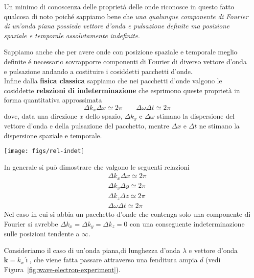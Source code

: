 Un minimo di conoscenza delle proprietà delle onde riconosce in questo
fatto qualcosa di noto poiché sappiamo bene che \emph{una qualunque
componente di Fourier di un'onda piana possiede vettore d'onda e
pulsazione definite ma posizione spaziale e temporale assolutamente
indefinite}.

Sappiamo anche che per avere onde con posizione spaziale e temporale
meglio definite é necessario sovrapporre componenti di Fourier di
diverso vettore d'onda e pulsazione andando a costituire i cosiddetti
pacchetti d'onde.\\
Infine dalla \textbf{fisica classica} sappiamo che nei pacchetti d'onde valgono
le cosiddette \textbf{relazioni di indeterminazione} che esprimono
queste proprietà in forma quantitativa approssimata
\[
    \Delta k_{x} \Delta x \simeq2 \pi \qquad \Delta \omega \Delta t \simeq2 \pi
\] dove, data una direzione $x$ dello spazio, \(\Delta k_{x}\) e
\(\Delta \omega\) stimano la dispersione del vettore d'onda e della
pulsazione del pacchetto, mentre \(\Delta x\) e \(\Delta t\) ne stimano
la dispersione spaziale e temporale.
\begin{marginfigure}
    \texttt{[image: figs/rel-indet]}
    \label{fig:rel-indet}
\end{marginfigure}

In generale si può dimostrare che valgono le seguenti relazioni
\begin{gather*}
    \Delta k_{x} \Delta x \simeq2 \pi\\
    \Delta k_{y} \Delta y \simeq2 \pi\\
    \Delta k_{z} \Delta z \simeq2 \pi\\
    \Delta \omega \Delta t \simeq2 \pi
\end{gather*} Nel caso in cui si abbia un pacchetto d'onde che contenga solo una
componente di Fourier si avrebbe
\(\Delta k_{x} = \Delta k_{y} = \Delta k_{z} = 0\) con una conseguente
indeterminazione sulle posizioni tendente a \(\infty\).

Consideriamo il caso di un'onda piana,di lunghezza d'onda \(\lambda\) e
vettore d'onda \(\bm{k} = k_x \hat{\imath}\), che viene fatta passare
attraverso una fenditura ampia \(d\) (vedi Figura~\ref{fig:wave-electron-experiment}).

